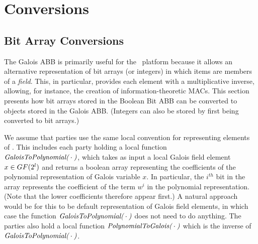 \section{Conversions}

\subsection{Bit Array Conversions}

The Galois ABB is primarily useful for the \SLCompute~platform 
because it allows an alternative representation of bit arrays (or integers)
in which items are members of a \emph{field}.
This, in particular, provides each element with a multiplicative inverse,
allowing, for instance, the creation of information-theoretic MACs.
This section presents how bit arrays stored in the Boolean Bit ABB
can be converted to objects stored in the Galois ABB.
(Integers can also be stored by first being converted to bit arrays.)

We assume that parties use the same local convention for representing
elements of \GFtwol.
This includes each party holding a local function \\
$\textit{GaloisToPolynomial(}\cdot\textit{)}$,
which takes as input a local Galois field element $x \in GF(2^l)$
and returns a boolean array representing the coefficients of the polynomial 
representation of Galois variable $x$.
In particular, the $i^{th}$ bit in the array represents the coefficient
of the term $w^i$ in the polynomial representation. 
(Note that the lower coefficients therefore appear first.)
A natural approach would be for this to be default representation of Galois
field elements, in which case the function $\textit{GaloisToPolynomial(}\cdot\textit{)}$ 
does not need to do anything.
The parties also hold a local function $\textit{PolynomialToGalois(}\cdot\textit{)}$ which is the inverse of
$\textit{GaloisToPolynomial(}\cdot\textit{)}$.

